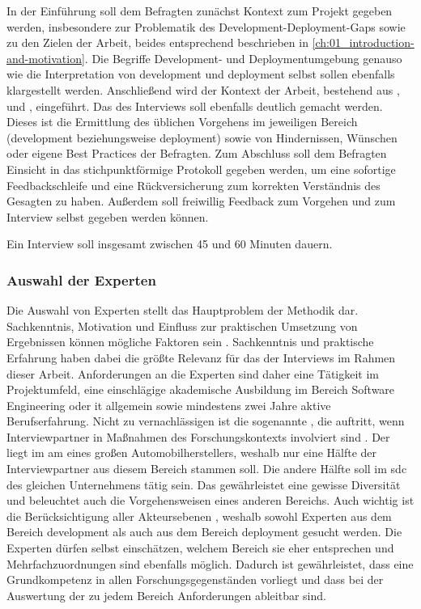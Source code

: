 In der Einführung soll dem Befragten zunächst Kontext zum Projekt gegeben werden, insbesondere zur Problematik des Development-Deployment-Gaps sowie zu den Zielen der Arbeit, beides entsprechend beschrieben in \autoref{ch:01_introduction-and-motivation}. Die Begriffe Development- und Deploymentumgebung genauso wie die Interpretation von \Gls{development} und \Gls{deployment} selbst sollen ebenfalls klargestellt werden. Anschließend wird der Kontext der Arbeit, bestehend aus ,  und , eingeführt. Das  des Interviews soll ebenfalls deutlich gemacht werden. Dieses ist die Ermittlung des üblichen Vorgehens im jeweiligen Bereich (\Gls{development} beziehungsweise \Gls{deployment}) sowie von Hindernissen, Wünschen oder eigene Best Practices der Befragten. Zum Abschluss soll dem Befragten Einsicht in das stichpunktförmige Protokoll gegeben werden, um eine sofortige Feedbackschleife und eine Rückversicherung zum korrekten Verständnis des Gesagten zu haben. Außerdem soll freiwillig Feedback zum Vorgehen und zum Interview selbst gegeben werden können.

Ein Interview soll insgesamt zwischen 45 und 60 Minuten dauern.

\subsubsection{Auswahl der Experten}
\label{subsubsec:04-01-02-03_selection-of-experts}

Die Auswahl von Experten stellt das Hauptproblem der Methodik dar. Sachkenntnis, Motivation und Einfluss zur praktischen Umsetzung von Ergebnissen können mögliche Faktoren sein \cite{401:Das-Experteninterview}. Sachkenntnis und praktische Erfahrung haben dabei die größte Relevanz für das  der Interviews im Rahmen dieser Arbeit. Anforderungen an die Experten sind daher eine Tätigkeit im Projektumfeld, eine einschlägige akademische Ausbildung im Bereich Software Engineering oder \Gls{it} allgemein sowie mindestens zwei Jahre aktive Berufserfahrung. Nicht zu vernachlässigen ist die sogenannte , die auftritt, wenn Interviewpartner in Maßnahmen des Forschungskontexts involviert sind \cite{401:Das-Experteninterview}. Der  liegt im \Gls{am} eines großen Automobilherstellers, weshalb nur eine Hälfte der Interviewpartner aus diesem Bereich stammen soll. Die andere Hälfte soll im \Gls{sdc} des gleichen Unternehmens tätig sein. Das gewährleistet eine gewisse Diversität und beleuchtet auch die Vorgehensweisen eines anderen Bereichs. Auch wichtig ist die Berücksichtigung aller Akteursebenen \cite{401:Das-Experteninterview}, weshalb sowohl Experten aus dem Bereich \Gls{development} als auch aus dem Bereich \Gls{deployment} gesucht werden. Die Experten dürfen selbst einschätzen, welchem Bereich sie eher entsprechen und Mehrfachzuordnungen sind ebenfalls möglich. Dadurch ist gewährleistet, dass eine Grundkompetenz in allen Forschungsgegenständen vorliegt und dass bei der Auswertung der  zu jedem Bereich Anforderungen ableitbar sind.


